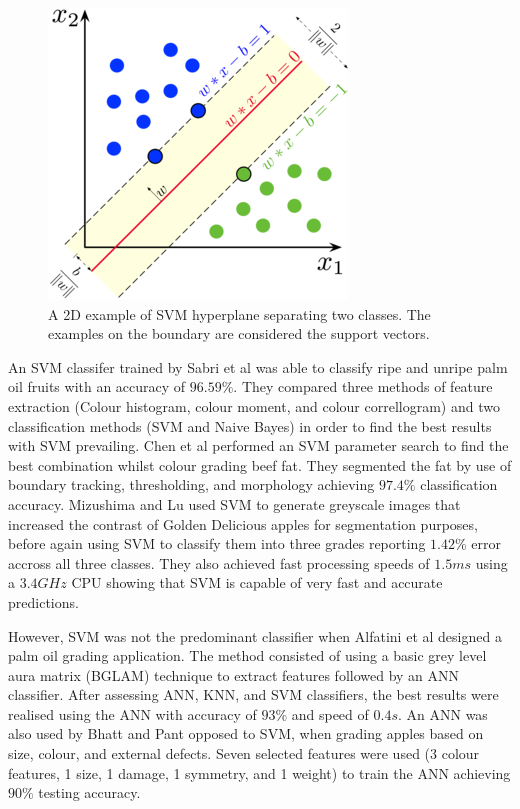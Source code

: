 \documentclass[fleqn,twoside,12pt]{report}
\begin{document}
\begin{figure}[h]
	\centering
	\includegraphics[width=0.5\linewidth]{SVM.png}
	\caption{A 2D example of SVM hyperplane separating two classes. The examples on the boundary are considered the support vectors.}
	\label{fig:SVM}
\end{figure}%



An SVM classifer trained by Sabri et al \cite{sabri} was able to classify ripe and unripe palm oil fruits with an accuracy of $96.59\%$. They compared three methods of feature extraction (Colour histogram, colour moment, and colour correllogram) and two classification methods (SVM and Naive Bayes) in order to find the best results with SVM prevailing. Chen et al \cite{chen} performed an SVM parameter search to find the best combination whilst colour grading beef fat. They segmented the fat by use of boundary tracking, thresholding, and morphology achieving $97.4\%$ classification accuracy. Mizushima and Lu \cite{mizushima} used SVM to generate greyscale images that increased the contrast of Golden Delicious apples for segmentation purposes, before again using SVM to classify them into three grades reporting $1.42\%$ error accross all three classes. They also achieved fast processing speeds of $1.5ms$ using a $3.4 GHz$ CPU showing that SVM is capable of very fast and accurate predictions. 

However, SVM was not the predominant classifier when Alfatini et al \cite{alfatni} designed a palm oil grading application. The method consisted of using a basic grey level aura matrix (BGLAM) technique to extract features followed by an ANN classifier. After assessing ANN, KNN, and SVM classifiers, the best results were realised using the ANN with accuracy of $93\%$ and speed of $0.4s$. An ANN was also used by Bhatt and Pant \cite{bhatt} opposed to SVM, when grading apples based on size, colour, and external defects. Seven selected features were used (3 colour features, 1 size, 1 damage, 1 symmetry, and 1 weight) to train the ANN achieving $90\%$ testing accuracy. 
\end{document}
